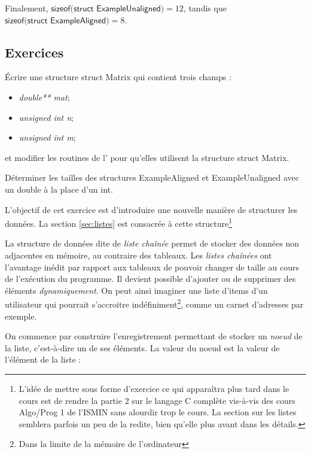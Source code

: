 \documentclass[../../../main.tex]{subfiles}
\begin{document}
Finalement, $\textsf{sizeof(struct ExampleUnaligned)} = 12$, tandis que $\textsf{sizeof(struct ExampleAligned)} = 8$.
\subsection{Exercices}
 Écrire une structure \textsf{struct Matrix} qui contient trois champs :
\begin{itemize}
	\item \textit{double** mat};
	\item \textit{unsigned int n};
	\item \textit{unsigned int m};
\end{itemize}
et modifier les routines de l' pour qu'elles utilisent la structure \textsf{struct Matrix}.

 Déterminer les tailles des structures \textsf{ExampleAligned} et \textsf{ExampleUnaligned} avec un \textsf{double} à la place d'un \textsf{int}.

L'objectif de cet exercice est d'introduire une nouvelle manière de structurer les données. La section \ref{sec:listes} est consacrée à cette structure\footnote{L'idée de mettre sous forme d'exercice ce qui apparaîtra plus tard dans le cours est de rendre la partie 2 sur le langage C complète vis-à-vis des cours Algo/Prog 1 de l'ISMIN sans  alourdir trop le cours. La section sur les listes semblera parfois un peu de la redite, bien qu'elle plus avant dans les détails.}

La structure de données dite de \textit{liste chaînée} permet de stocker des données non adjacentes en mémoire, au contraire des tableaux. Les \textit{listes chaînées} ont l'avantage inédit par rapport aux tableaux de pouvoir changer de taille au cours de l'exécution du programme. Il devient possible d'ajouter ou de supprimer des éléments \textit{dynamiquement}. On peut ainsi imaginer une liste d'items d'un utilisateur qui pourrait s'accroitre indéfiniment\footnote{Dans la limite de la mémoire de l'ordinateur}, comme un carnet d'adresses par exemple.
 
On commence par construire l'enregistrement permettant de stocker un \textit{noeud} de la liste, c'est-à-dire un de ses éléments. La valeur du noeud est la valeur de l'élément de la liste :
 
\begin{minipage}{\textwidth}
	\begin{center}
		
		\label{img:node}
	\end{center}
\end{minipage}
\end{document}
